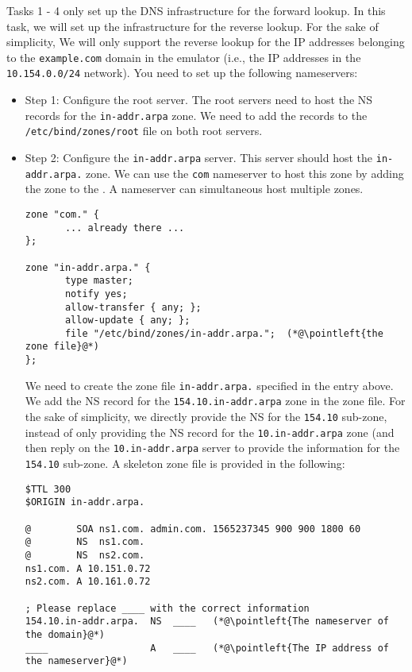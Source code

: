 Tasks 1 - 4 only set up the DNS infrastructure for the forward 
lookup. In this task, we will set up the infrastructure 
for the reverse lookup. For the sake of simplicity,
We will only support the reverse 
lookup for the IP addresses belonging to the \texttt{example.com} 
domain in the emulator (i.e., the IP addresses in the 
\texttt{10.154.0.0/24} network). You need to set up the following 
nameservers:


\begin{itemize}
\item Step 1: Configure the root server. 
The root servers need to host the NS records for the \texttt{in-addr.arpa} zone.
We need to add the records to the \texttt{/etc/bind/zones/root} file
on both root servers.

\item Step 2: Configure the \texttt{in-addr.arpa} server. 
This server should host the \texttt{in-addr.arpa.} zone.  
We can use the \texttt{com} nameserver to host this zone by
adding the zone to the . 
A nameserver can simultaneous host multiple zones. 

\begin{lstlisting}
zone "com." {
       ... already there ...
};

zone "in-addr.arpa." {
       type master;
       notify yes;
       allow-transfer { any; };
       allow-update { any; };
       file "/etc/bind/zones/in-addr.arpa.";  (*@\pointleft{the zone file}@*) 
};
\end{lstlisting}
     
We need to create the zone file \texttt{in-addr.arpa.} specified 
in the entry above. We add the NS record for the 
\texttt{154.10.in-addr.arpa} zone in the zone file. 
For the sake of simplicity,
we directly provide the NS for the \texttt{154.10} sub-zone,
instead of only providing the NS record for the
\texttt{10.in-addr.arpa} zone (and then reply on 
the \texttt{10.in-addr.arpa} server to provide the information 
for the \texttt{154.10} sub-zone.  A skeleton zone file 
is provided in the following: 

\begin{lstlisting}
$TTL 300
$ORIGIN in-addr.arpa.

@        SOA ns1.com. admin.com. 1565237345 900 900 1800 60
@        NS  ns1.com.
@        NS  ns2.com.
ns1.com. A 10.151.0.72
ns2.com. A 10.161.0.72

; Please replace ____ with the correct information
154.10.in-addr.arpa.  NS  ____   (*@\pointleft{The nameserver of the domain}@*) 
____                  A   ____   (*@\pointleft{The IP address of the nameserver}@*)
\end{lstlisting}
     

\end{itemize}
